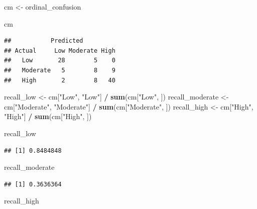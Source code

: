 \documentclass[
]{article}
\newenvironment{Shaded}{\begin{snugshade}}{\end{snugshade}}
\newcommand{\FunctionTok}[1]{\textcolor[rgb]{0.13,0.29,0.53}{\textbf{#1}}}
\newcommand{\NormalTok}[1]{#1}
\newcommand{\OtherTok}[1]{\textcolor[rgb]{0.56,0.35,0.01}{#1}}
\newcommand{\SpecialCharTok}[1]{\textcolor[rgb]{0.81,0.36,0.00}{\textbf{#1}}}
\newcommand{\StringTok}[1]{\textcolor[rgb]{0.31,0.60,0.02}{#1}}
\begin{document}
\begin{Shaded}
\begin{Highlighting}[]
\NormalTok{cm }\OtherTok{\textless{}{-}}\NormalTok{ ordinal\_confusion}
\end{Highlighting}
\end{Shaded}

\begin{Shaded}
\begin{Highlighting}[]
\NormalTok{cm}
\end{Highlighting}
\end{Shaded}

\begin{verbatim}
##           Predicted
## Actual     Low Moderate High
##   Low       28        5    0
##   Moderate   5        8    9
##   High       2        8   40
\end{verbatim}

\begin{Shaded}
\begin{Highlighting}[]
\NormalTok{recall\_low }\OtherTok{\textless{}{-}}\NormalTok{ cm[}\StringTok{"Low"}\NormalTok{, }\StringTok{"Low"}\NormalTok{] }\SpecialCharTok{/} \FunctionTok{sum}\NormalTok{(cm[}\StringTok{"Low"}\NormalTok{, ])}
\NormalTok{recall\_moderate }\OtherTok{\textless{}{-}}\NormalTok{ cm[}\StringTok{"Moderate"}\NormalTok{, }\StringTok{"Moderate"}\NormalTok{] }\SpecialCharTok{/} \FunctionTok{sum}\NormalTok{(cm[}\StringTok{"Moderate"}\NormalTok{, ])}
\NormalTok{recall\_high }\OtherTok{\textless{}{-}}\NormalTok{ cm[}\StringTok{"High"}\NormalTok{, }\StringTok{"High"}\NormalTok{] }\SpecialCharTok{/} \FunctionTok{sum}\NormalTok{(cm[}\StringTok{"High"}\NormalTok{, ])}

\NormalTok{recall\_low}
\end{Highlighting}
\end{Shaded}

\begin{verbatim}
## [1] 0.8484848
\end{verbatim}

\begin{Shaded}
\begin{Highlighting}[]
\NormalTok{recall\_moderate}
\end{Highlighting}
\end{Shaded}

\begin{verbatim}
## [1] 0.3636364
\end{verbatim}

\begin{Shaded}
\begin{Highlighting}[]
\NormalTok{recall\_high}
\end{Highlighting}
\end{Shaded}
\end{document}
